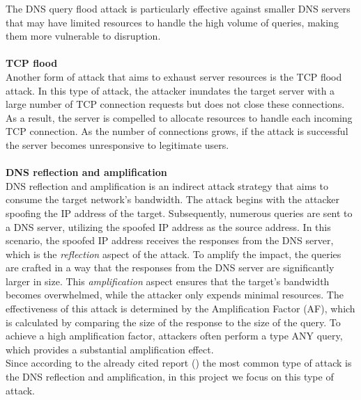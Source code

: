 The DNS query flood attack is particularly effective against smaller DNS servers that may have limited resources to handle 
the high volume of queries, making them more vulnerable to disruption.\\
\\
\textbf{TCP flood}\\
Another form of attack that aims to exhaust server resources is the TCP flood attack. In this type of attack, the attacker inundates the 
target server with a large number of TCP connection requests but does not close these connections. As a result, the server is compelled 
to allocate resources to handle each incoming TCP connection. As the number of connections grows, if the attack is successful the server 
becomes unresponsive to legitimate users.\\
\\
\textbf{DNS reflection and amplification}\\
DNS reflection and amplification is an indirect attack strategy that aims to consume the target network's bandwidth. The attack 
begins with the attacker spoofing the IP address of the target. Subsequently, numerous queries are sent to a DNS server, utilizing the 
spoofed IP address as the source address. In this scenario, the spoofed IP address receives the responses from the DNS server, which 
is the \textit{reflection} aspect of the attack.
To amplify the impact, the queries are crafted in a way that the responses from the DNS server are significantly larger 
in size. This \textit{amplification} aspect ensures that the target's bandwidth becomes overwhelmed, while the attacker only expends minimal resources.
The effectiveness of this attack is determined by the Amplification Factor (AF), which is calculated by comparing the size of the response to 
the size of the query. To achieve a high amplification factor, attackers often perform a type ANY query, which provides a 
substantial amplification effect.
\\
Since according to the already cited report (\cite{DDoSthreatreport}) the most common type of attack is the DNS reflection and amplification,
in this project we focus on this type of attack.


